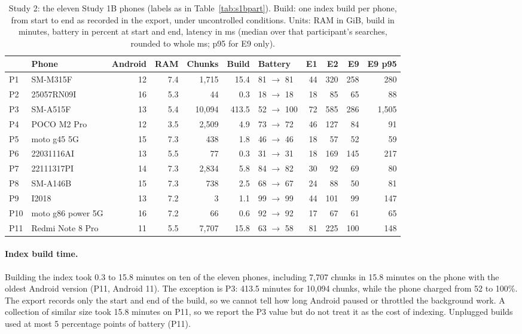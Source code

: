 \documentclass[pdflatex,sn-basic,Numbered]{sn-jnl}
\begin{document}
\begin{table}[tbp]
\centering\footnotesize\setlength{\tabcolsep}{3pt}
\caption{Study 2: the eleven Study 1B phones (labels as in Table~\ref{tab:s1bpart}). Build: one index build per phone, from start to end as recorded in the export, under uncontrolled conditions. Units: RAM in GiB, build in minutes, battery in percent at start and end, latency in ms (median over that participant's searches, rounded to whole ms; p95 for E9 only).}
\label{tab:s1bphones}
\begin{tabular}{llrrrrlrrrr}
\toprule
 & Phone & Android & RAM & Chunks & Build & Battery & E1 & E2 & E9 & E9 p95 \\
\midrule
P1 & SM-M315F & 12 & 7.4 & 1,715 & 15.4 & 81 $\to$ 81\footnotemark[2] & 44 & 320 & 258 & 280 \\
P2 & 25057RN09I & 16 & 5.3 & 44 & 0.3 & 18 $\to$ 18 & 18 & 85 & 65 & 88 \\
P3 & SM-A515F & 13 & 5.4 & 10,094 & 413.5\footnotemark[1] & 52 $\to$ 100\footnotemark[2] & 72 & 585 & 286 & 1,505 \\
P4 & POCO M2 Pro & 12 & 3.5 & 2,509 & 4.9 & 73 $\to$ 72 & 46 & 127 & 84 & 91 \\
P5 & moto g45 5G & 15 & 7.3 & 438 & 1.8 & 46 $\to$ 46 & 18 & 57 & 52 & 59 \\
P6 & 22031116AI & 13 & 5.5 & 77 & 0.3 & 31 $\to$ 31 & 18 & 169 & 145 & 217 \\
P7 & 22111317PI & 14 & 7.3 & 2,834 & 5.8 & 84 $\to$ 82 & 30 & 92 & 69 & 80 \\
P8 & SM-A146B & 15 & 7.3 & 738 & 2.5 & 68 $\to$ 67 & 24 & 88 & 50 & 81 \\
P9 & I2018 & 13 & 7.2 & 3 & 1.1 & 99 $\to$ 99 & 44 & 101 & 99 & 147 \\
P10 & moto g86 power 5G & 16 & 7.2 & 66 & 0.6 & 92 $\to$ 92\footnotemark[2] & 17 & 67 & 61 & 65 \\
P11 & Redmi Note 8 Pro & 11 & 5.5 & 7,707 & 15.8 & 63 $\to$ 58 & 81 & 225 & 100 & 148 \\
\bottomrule
\end{tabular}
\end{table}

\paragraph{Index build time.} Building the index took 0.3 to 15.8 minutes on ten of the eleven phones, including 7,707 chunks in 15.8 minutes on the phone with the oldest Android version (P11, Android 11). The exception is P3: 413.5 minutes for 10,094 chunks, while the phone charged from 52 to 100\%. The export records only the start and end of the build, so we cannot tell how long Android paused or throttled the background work. A collection of similar size took 15.8 minutes on P11, so we report the P3 value but do not treat it as the cost of indexing. Unplugged builds used at most 5 percentage points of battery (P11).
\end{document}
